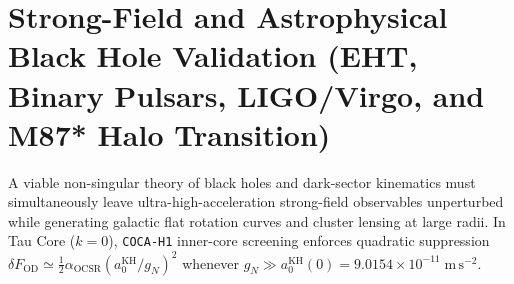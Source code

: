 \documentclass[11pt,a4paper]{article}
\theoremstyle{remark}
\begin{document}
\section{Strong-Field and Astrophysical Black Hole Validation (EHT, Binary Pulsars, LIGO/Virgo, and M87* Halo Transition)}
\label{sec:bh_validation}

A viable non-singular theory of black holes and dark-sector kinematics must simultaneously leave ultra-high-acceleration strong-field observables unperturbed while generating galactic flat rotation curves and cluster lensing at large radii. In Tau Core ($k = 0$), \texttt{COCA-H1} inner-core screening enforces quadratic suppression $\delta F_{\mathrm{OD}} \simeq \frac{1}{2}\alpha_{\mathrm{OCSR}}(a_0^{\mathrm{KH}} / g_N)^2$ whenever $g_N \gg a_0^{\mathrm{KH}}(0) = 9.0154 \times 10^{-11}\;\mathrm{m\,s^{-2}}$.
\end{document}
